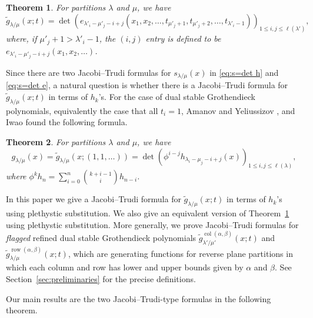 \documentclass[12pt]{amsart}
\numberwithin{equation}{section}
\newtheorem{thm}{Theorem}[section]
\theoremstyle{definition}
\newcommand\wg{\widetilde{g}}
\newcommand\col{\operatorname{col}}
\newcommand\row{\operatorname{row}}
\newcommand\lm{{\lambda/\mu}}
\begin{document}
\begin{thm}\label{thm:JT}\cite{AmanovYeliussizov, Kim:JT}
For partitions $\lambda$ and $\mu$, we have
\[
  \widetilde{g}_{\lambda/\mu}(x;t) = \det
  \left( e_{\lambda'_i-\mu'_j-i+j}
    (x_1,x_2,\dots,t_{\mu'_j+1},t_{\mu'_j+2},\dots,t_{\lambda'_i-1})
  \right)_{1\le i,j\le \ell(\lambda')},
\]
where, if $\mu'_j+1>\lambda'_i-1$, the $(i,j)$ entry is defined to be
$e_{\lambda'_i-\mu'_j-i+j} (x_1,x_2,\dots)$.
\end{thm}

Since there are two Jacobi--Trudi formulas for $s_{\lm}(x)$ in \eqref{eq:s=det
  h} and \eqref{eq:s=det e}, a natural question is whether there is a
Jacobi--Trudi formula for $\wg_\lm(x;t)$ in terms of $h_k$'s. For the case of
dual stable Grothendieck polynomials, equivalently the case that all $t_i=1$,
Amanov and Yeliussizov \cite[Theorem~14]{AmanovYeliussizov}, and Iwao
\cite[Proposition~5.2]{iwao20:free_groth} found the following formula.


\begin{thm}\label{thm:JT2}
\cite{AmanovYeliussizov, iwao20:free_groth}
For partitions $\lambda$ and $\mu$, we have
\[
  g_\lm(x)=\widetilde{g}_{\lambda/\mu}(x;(1,1,\dots)) = \det
  \left( \phi^{i-j} h_{\lambda_i-\mu_j-i+j} (x)
  \right)_{1\le i,j\le \ell(\lambda)},
\]
where $\phi^k h_n = \sum_{i=0}^n \binom{k+i-1}{i} h_{n-i}$.
\end{thm}

In this paper we give a Jacobi--Trudi formula for $\wg_\lm(x;t)$ in terms of
$h_k$'s using plethystic substitution. We also give an equivalent version of
Theorem~\ref{thm:JT} using plethystic substitution. More generally, we prove
Jacobi--Trudi formulas for \emph{flagged} refined dual stable Grothendieck
polynomials $\wg_{\lambda'/\mu'}^{\col(\alpha,\beta)}(x;t)$ and
$\wg_{\lambda/\mu}^{\row(\alpha,\beta)}(x;t)$, which are generating functions
for reverse plane partitions in which each column and row has lower and upper
bounds given by $\alpha$ and $\beta$. See Section~\ref{sec:preliminaries} for
the precise definitions.

Our main results are the two Jacobi--Trudi-type formulas in the following
theorem.
\end{document}
